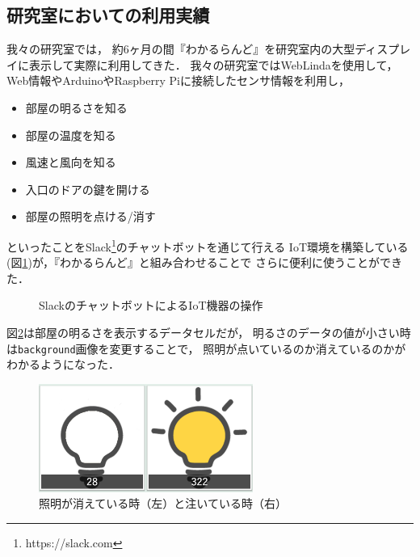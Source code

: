 \subsection{研究室においての利用実績}
我々の研究室では，
約6ヶ月の間『わかるらんど』を研究室内の大型ディスプレイに表示して実際に利用してきた．
我々の研究室ではWebLindaを使用して，
Web情報やArduinoやRaspberry Piに接続したセンサ情報を利用し，
\begin{itemize}
\item 部屋の明るさを知る
\item 部屋の温度を知る
\item 風速と風向を知る
\item 入口のドアの鍵を開ける
\item 部屋の照明を点ける/消す
\end{itemize}
といったことをSlack\footnote{https://slack.com}のチャットボットを通じて行える
IoT環境を構築している(図\ref{slack})が，『わかるらんど』と組み合わせることで
さらに便利に使うことができた．

\begin{figure}[h]
\centering
{}
\caption{SlackのチャットボットによるIoT機器の操作}
\label{slack}
\end{figure}

図\ref{light}は部屋の明るさを表示するデータセルだが，
明るさのデータの値が小さい時は\texttt{background}画像を変更することで，
照明が点いているのか消えているのかがわかるようになった．

\begin{figure}[h]
\centering
\includegraphics[width=7cm]{images/light.png}
\caption{照明が消えている時（左）と注いている時（右）}
\label{light}
\end{figure}

